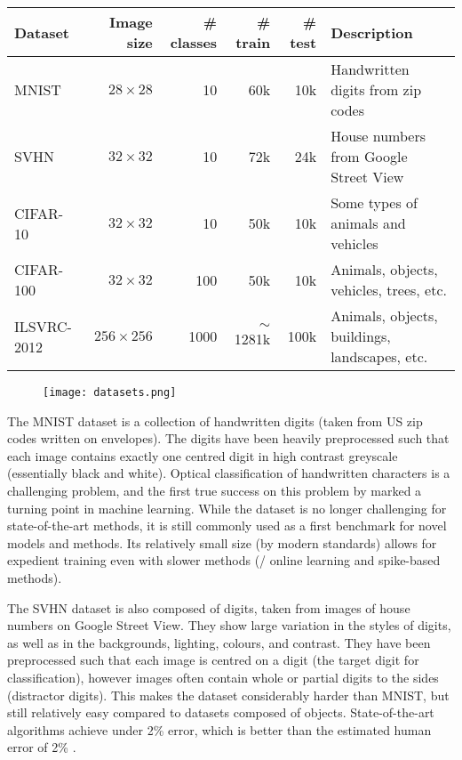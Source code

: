 \begin{sidewaystable}
  \begin{tabular}{lrrrrl}
    Dataset & Image size & \# classes & \# train & \# test & Description\\\hline
    MNIST & $28 \times 28$ & 10 & 60k & 10k & Handwritten digits from zip codes\\
    SVHN & $32 \times 32$ & 10 & 72k & 24k & House numbers from Google Street View\\
    CIFAR-10 & $32 \times 32$ & 10 & 50k & 10k & Some types of animals and vehicles\\
    CIFAR-100 & $32 \times 32$ & 100 & 50k & 10k & Animals, objects, vehicles, trees, etc.\\
    ILSVRC-2012 & $256 \times 256$ & 1000 & $\sim$1281k & 100k & Animals, objects, buildings, landscapes, etc.\\
  \end{tabular}
\end{sidewaystable}

\begin{figure}
  \centering
  \texttt{[image: datasets.png]}
\end{figure}

The MNIST dataset \parencite{Lecun1998} is a collection of handwritten digits
(taken from US zip codes written on envelopes).
The digits have been heavily preprocessed such that each image
contains exactly one centred digit in high contrast greyscale
(essentially black and white).
Optical classification of handwritten characters is a challenging problem,
and the first true success on this problem by \textcite{Lecun1998}
marked a turning point in machine learning.
While the dataset is no longer challenging for state-of-the-art methods,
it is still commonly used as a first benchmark for novel models and methods.
Its relatively small size (by modern standards)
allows for expedient training even with slower methods
(\eg/ online learning and spike-based methods).

The SVHN dataset \parencite{Netzer2011} is also composed of digits,
taken from images of house numbers on Google Street View.
They show large variation in the styles of digits,
as well as in the backgrounds, lighting, colours, and contrast.
They have been preprocessed such that each image is centred
on a digit (the target digit for classification),
however images often contain whole or partial digits to the sides
(distractor digits).
This makes the dataset considerably harder than MNIST,
but still relatively easy compared to datasets composed of objects.
State-of-the-art algorithms achieve under 2\% error,
which is better than the estimated human error of 2\% \parencite{Netzer2011}.

